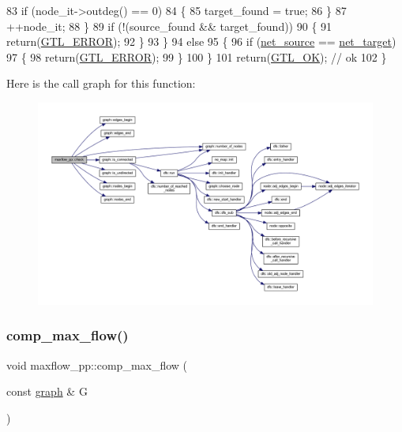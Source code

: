 \begin{DoxyCode}
83         \textcolor{keywordflow}{if} (node\_it->outdeg() == 0)
84         \{
85         target\_found = \textcolor{keyword}{true};
86         \}
87         ++node\_it;
88     \}
89     \textcolor{keywordflow}{if} (!(source\_found && target\_found))
90     \{
91         \textcolor{keywordflow}{return}(\mbox{\hyperlink{classalgorithm_af1a0078e153aa99c24f9bdf0d97f6710a6fcf574690bbd6cf710837a169510dd7}{GTL\_ERROR}});
92     \}
93     \}
94     \textcolor{keywordflow}{else}
95     \{
96     \textcolor{keywordflow}{if} (\mbox{\hyperlink{classmaxflow__pp_a20f2d05465acc2d7b777ea8025d12003}{net\_source}} == \mbox{\hyperlink{classmaxflow__pp_a10f0b047011e04cb4816a824da5b7892}{net\_target}})
97     \{
98         \textcolor{keywordflow}{return}(\mbox{\hyperlink{classalgorithm_af1a0078e153aa99c24f9bdf0d97f6710a6fcf574690bbd6cf710837a169510dd7}{GTL\_ERROR}});
99     \}
100     \}
101     \textcolor{keywordflow}{return}(\mbox{\hyperlink{classalgorithm_af1a0078e153aa99c24f9bdf0d97f6710a5114c20e4a96a76b5de9f28bf15e282b}{GTL\_OK}});   \textcolor{comment}{// ok}
102 \}
\end{DoxyCode}
Here is the call graph for this function\+:\nopagebreak
\begin{figure}[H]
\begin{center}
\leavevmode
\includegraphics[width=350pt]{classmaxflow__pp_a7ea24bd88999718e5e4e28ac028131cd_cgraph}
\end{center}
\end{figure}
\mbox{\label{classmaxflow__pp_a6a8a301739757493318b1abfbed2698b}} 
\subsubsection{\texorpdfstring{comp\+\_\+max\+\_\+flow()}{comp\_max\_flow()}}
{\footnotesize\ttfamily void maxflow\+\_\+pp\+::comp\+\_\+max\+\_\+flow (\begin{DoxyParamCaption}\item[{const \mbox{\hyperlink{classgraph}{graph}} \&}]{G }\end{DoxyParamCaption})\hspace{0.3cm}{\ttfamily [protected]}}



